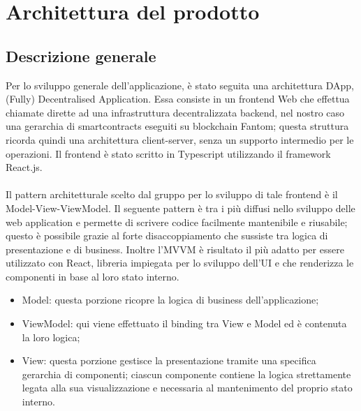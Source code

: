 \section{Architettura del prodotto}\label{section:architettura del prodotto}
\subsection{Descrizione generale}

Per lo sviluppo generale dell'applicazione, è stato seguita una architettura DApp, (Fully) Decentralised Application.
Essa consiste in un frontend Web che effettua chiamate dirette ad una infrastruttura decentralizzata backend, nel 
nostro caso una gerarchia di smartcontracts eseguiti su blockchain Fantom; 
questa struttura ricorda quindi una architettura client-server, senza un supporto intermedio per le operazioni.
Il frontend è stato scritto in Typescript utilizzando il framework React.js.
\\
\\
Il pattern architetturale scelto dal gruppo per lo sviluppo di tale frontend è il Model-View-ViewModel. Il
seguente pattern è tra i più diffusi nello sviluppo delle web application e permette di scrivere codice
facilmente mantenibile e riusabile; questo è possibile grazie al forte disaccoppiamento che sussiste tra
logica di presentazione e di business. Inoltre l'MVVM è risultato il più adatto per essere utilizzato con
React, libreria impiegata per lo sviluppo dell'UI e che renderizza le componenti in base al loro stato
interno.
\begin{itemize}
\item Model: questa porzione ricopre la logica di business dell'applicazione; %
\item ViewModel: qui viene effettuato il binding tra View e Model ed è contenuta la loro logica;
\item View: questa porzione gestisce la presentazione tramite una specifica gerarchia di componenti;
ciascun componente contiene la logica strettamente legata alla sua visualizzazione e necessaria al
mantenimento del proprio stato interno.
\end{itemize}

